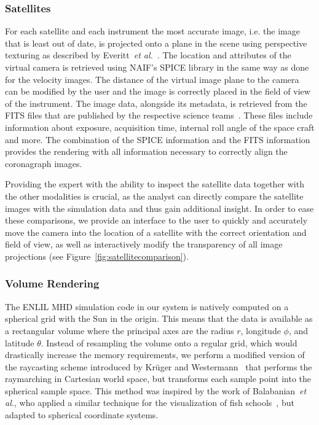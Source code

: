 \documentclass[journal]{vgtc}                %
\def\etal{\textit{et al.}}
\def\etal{\textit{et al.}}
\begin{document}
\subsubsection{Satellites} \label{sec:satelltes}
For each satellite and each instrument the most accurate image, i.e. the image that is least out of date, is projected onto a plane in the scene using perspective texturing as described by Everitt~\etal~\cite{Everitt:2001tg}. The location and attributes of the virtual camera is retrieved using NAIF's SPICE library in the same way as done for the velocity images. The distance of the virtual image plane to the camera can be modified by the user and the image is correctly placed in the field of view of the instrument. The image data, alongside its metadata, is retrieved from the FITS files that are published by the respective science teams~\cite{wells1981fits}. These files include information about exposure, acquisition time, internal roll angle of the space craft and more. The combination of the SPICE information and the FITS information provides the rendering with all information necessary to correctly align the coronagraph images.

Providing the expert with the ability to inspect the satellite data together with the other modalities is crucial, as the analyst can directly compare the satellite images with the simulation data and thus gain additional insight. In order to ease these comparisons, we provide an interface to the user to quickly and accurately move the camera into the location of a satellite with the correct orientation and field of view, as well as interactively modify the transparency of all image projections (see Figure~\ref{fig:satellitecomparison}).

\subsubsection{Volume Rendering} \label{sec:volumerendering}
The ENLIL MHD simulation code in our system is natively computed on a spherical grid with the Sun in the origin. This means that the data is available as a rectangular volume where the principal axes are the radius $r$, longitude $\phi$, and latitude $\theta$. Instead of resampling the volume onto a regular grid, which would drastically increase the memory requirements, we perform a modified version of the raycasting scheme introduced by Kr\"uger and Westermann~\cite{Kruger:2003ge} that performs the raymarching in Cartesian world space, but transforms each sample point into the spherical sample space. This method was inspired by the work of Balabanian~\etal , who applied a similar technique for the visualization of fish schools~\cite{balabanian-2007-ant}, but adapted to spherical coordinate systems.
\end{document}
